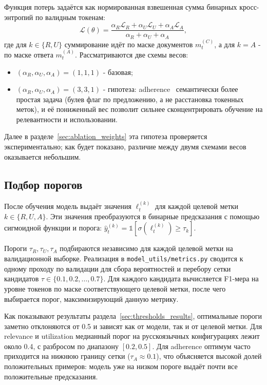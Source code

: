 Функция потерь задаётся как нормированная взвешенная сумма бинарных кросс-энтропий по валидным токенам:
\[
\mathcal{L}(\theta) =
\frac{\alpha_R \mathcal{L}_R + \alpha_U \mathcal{L}_U + \alpha_A \mathcal{L}_A}
{\alpha_R + \alpha_U + \alpha_A},
\]
где для $k \in \{R, U\}$ суммирование идёт по маске документов $m^{(C)}_t$, а для $k = A$ -
 по маске ответа $m^{(A)}_t$. Рассматриваются две схемы весов:
\begin{itemize}
  \item $(\alpha_R, \alpha_U, \alpha_A) = (1, 1, 1)$ - базовая;
  \item $(\alpha_R, \alpha_U, \alpha_A) = (3, 3, 1)$ - гипотеза: adherence~
  семантически более простая задача (булев флаг по предложению, а не расстановка токенных меток),
   и её пониженный вес позволит сильнее сконцентрировать обучение на релевантности и использовании.
\end{itemize}
Далее в разделе~\ref{sec:ablation_weights} эта гипотеза проверяется экспериментально;
как будет показано, различие между двумя схемами весов оказывается небольшим.

\subsection{Подбор порогов}
\label{sec:thresholds}

После обучения модель выдаёт значения $\ell^{(k)}_t$ для каждой целевой
метки $k \in \{R, U, A\}$. Эти значения преобразуются в бинарные
предсказания с помощью сигмоидной функции и порога:
$\hat{y}^{(k)}_t = \mathbb{1}[\sigma(\ell^{(k)}_t) \ge \tau_k]$.

Пороги $\tau_R, \tau_U, \tau_A$ подбираются независимо для каждой целевой
метки на валидационной выборке.
 Реализация в \texttt{model\_utils/metrics.py} 
сводится к одному проходу по валидации для сбора вероятностей и перебору сетки
 кандидатов $\tau \in \{0{.}1, 0{.}2, \dots, 0{.}7\}$. Для каждого 
 кандидата вычисляется F1-мера на уровне токенов по маске соответствующего
  целевой метки, после чего выбирается порог, максимизирующий данную метрику.

Как показывают результаты раздела~\ref{sec:thresholds_results}, оптимальные
пороги заметно отклоняются от 0.5 и зависят как от модели, так и от целевой метки.
Для relevance и utilization медианный порог на русскоязычных конфигурациях
лежит около 0.4, с разбросом по диапазону $[0.2, 0.5]$. Для adherence оптимум
часто приходится на нижнюю границу сетки ($\tau_A \approx 0{.}1$), что
объясняется высокой долей положительных примеров: модель уже на низком пороге
выдаёт почти все положительные предсказания.

